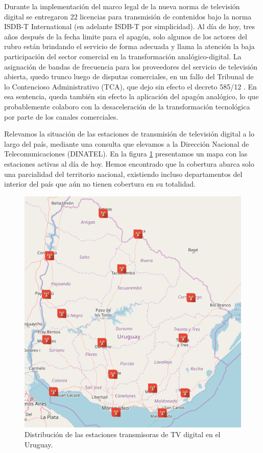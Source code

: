 Durante la implementación del marco legal de la nueva norma de televisión digital se entregaron 22 licencias para transmisión de contenidos bajo la norma ISDB-T International (en adelante ISDB-T por simplicidad). Al día de hoy, tres años después de la fecha limite para el apagón, solo algunos de los actores del rubro están brindando el servicio de forma adecuada y llama la atención la baja participación del sector comercial en la transformación analógico-digital. La asignación de bandas de frecuencia para los proveedores del servicio de televisión abierta, quedo trunco luego de disputas comerciales, en un fallo del Tribunal de lo Contencioso Administrativo (TCA), que dejo sin efecto el decreto 585/12 \cite{cancelacion_decreto_apagon}. En esa sentencia, queda también sin efecto la aplicación del apagón analógico, lo que probablemente colaboro con la desaceleración de la transformación tecnológica por parte de los canales comerciales.

Relevamos la situación de las estaciones de transmisión de televisión digital a lo largo del país, mediante una consulta que elevamos a la Dirección Nacional de Telecomunicaciones (DINATEL). En la figura \ref{mapa_estaciones} presentamos un mapa con las estaciones activas al día de hoy. Hemos encontrado que la cobertura abarca solo una parcialidad del territorio nacional, existiendo incluso departamentos del interior del país que aún no tienen cobertura en su totalidad.

\begin{figure}
	\centering
	\includegraphics[scale=0.3]{figuras/cap01/mapa_estaciones}
	\caption{\label{mapa_estaciones} Distribución de las estaciones transmisoras de TV digital en el Uruguay.}
\end{figure}

